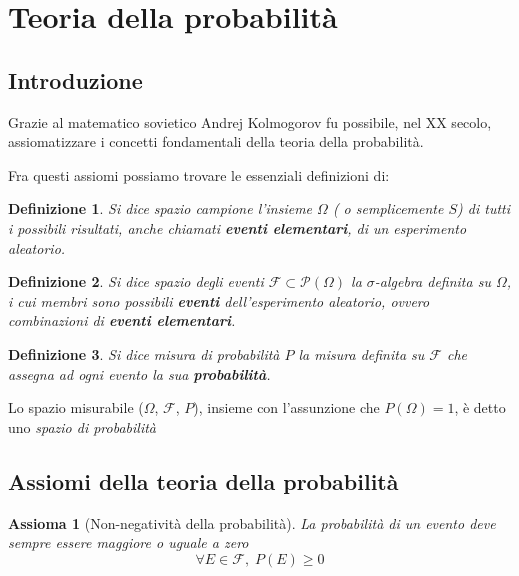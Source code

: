 \documentclass{article}
\newtheorem{definition}{Definizione}
\newtheorem{axiom}{Assioma}
\begin{document}
    \section{Teoria della probabilità}
        \subsection{Introduzione}
            Grazie al matematico sovietico Andrej Kolmogorov fu possibile, nel XX secolo, assiomatizzare i concetti fondamentali della teoria della probabilità.

            \vspace{10pt}
            Fra questi assiomi possiamo trovare le essenziali definizioni di:

            \begin{definition}
                Si dice spazio campione l'insieme $\Omega$ ( o semplicemente $S$) di tutti i possibili risultati, anche chiamati \textbf{eventi elementari}, di un esperimento aleatorio.
            \end{definition}

            \begin{definition}
                Si dice spazio degli eventi $\mathcal{F} \subset \mathcal{P}(\Omega)$ la $\sigma$-algebra definita su $\Omega$, i cui membri sono possibili \textbf{eventi} dell'esperimento aleatorio, ovvero combinazioni di \textbf{eventi elementari}.
            \end{definition}

            \begin{definition}
                Si dice misura di probabilità $P$ la misura definita su $\mathcal{F}$ che assegna ad ogni evento la sua \textbf{probabilità}.
            \end{definition}

            Lo spazio misurabile ($\Omega$, $\mathcal{F}$, $P$), insieme con l'assunzione che $P(\Omega) = 1$, è detto uno \textit{spazio di probabilità}

        \subsection{Assiomi della teoria della probabilità}
            \begin{axiom}[Non-negatività della probabilità]
                La probabilità di un evento deve sempre essere maggiore o uguale a zero 
                \[
                    \forall E \in \mathcal{F}, \; P(E) \geq 0
                \]
            \end{axiom}
\end{document}
